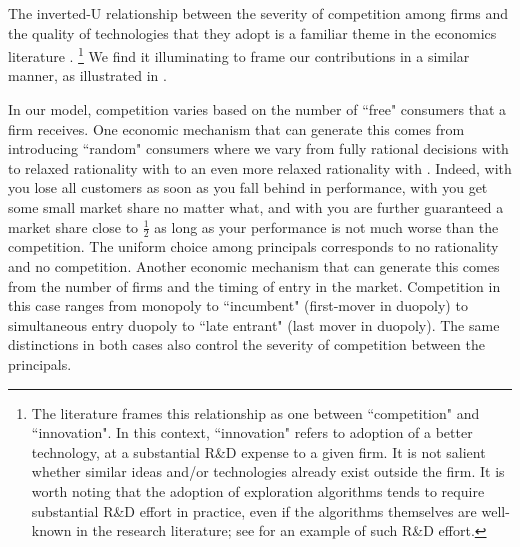 The inverted-U relationship between the severity of competition among firms and the quality of technologies that they adopt is a familiar theme in the economics literature \citep[\eg][]{Aghion-QJE05,Vives-08}.%
\footnote{The literature frames this relationship as one between ``competition" and ``innovation". In this context, ``innovation" refers to adoption of a better technology, at a substantial R\&D expense to a given firm. It is not salient whether similar ideas and/or technologies already exist outside the firm. It is worth noting that the adoption of exploration algorithms tends to require substantial R\&D effort in practice, even if the algorithms themselves are well-known in the research literature; see \citet{MWT-WhitePaper-2016} for an example of such R\&D effort.}
We find it illuminating to frame our contributions in a similar manner, as illustrated in .

In our model, competition varies based on the number of ``free" consumers that a firm receives. One economic mechanism that can generate this comes from introducing ``random" consumers where we vary from fully rational decisions with \HardMax to relaxed rationality with \HardMaxRandom to an even more relaxed rationality with \SoftMaxRandom. Indeed, with \HardMax you lose all customers as soon as you fall behind in performance, with \HardMaxRandom you get some small market share no matter what, and with \SoftMaxRandom you are further guaranteed a market share close to $\tfrac12$ as long as your performance is not much worse than the competition. The uniform choice among principals corresponds to no rationality and no competition. Another economic mechanism that can generate this comes from the number of firms and the timing of entry in the market. Competition in this case ranges from monopoly to ``incumbent" (first-mover in duopoly) to simultaneous entry duopoly to ``late entrant" (last mover in duopoly). The same distinctions in both cases also control the severity of competition between the principals.

